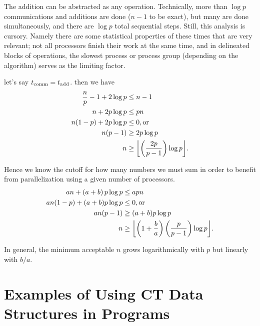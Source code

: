 The addition can be abstracted as any operation. Technically, more than
$\log{p}$ communications and additions are done ($n-1$ to be exact), but many
are done simultaneously, and there are $\log{p}$ total sequential steps. Still,
this analysis is cursory. Namely there are some statistical properties of these
times that are very relevant; not all processors finish their work at the same
time, and in delineated blocks of operations, the slowest process or process
group (depending on the algorithm) serves as the limiting factor.

let's say $t_\mathrm{comm} = t_\mathrm{add}$. then we have
\begin{align*}
\frac{n}{p} - 1 + 2\log{p}  &\leq n-1                   \\
n + 2p\log{p}               &\leq pn                    \\
n(1 - p) + 2p\log{p}        &\leq 0 \mathrm{, or}       \\
n(p - 1)                    &\geq 2p\log{p}             \\
n                           &\geq \floor*{\left(\frac{2p}{p-1}\right)\log{p}}.
\end{align*}

Hence we know the cutoff for how many numbers we must sum in order to benefit
from parallelization using a given number of processors. 
\begin{align*}
an + \left(a+b\right)p\log{p}   &\leq apn              \\
an(1 - p) + (a+b)p\log{p}       &\leq 0 \mathrm{, or}  \\
an(p - 1)                       &\geq (a+b)p\log{p}    \\
n &\geq \floor*{\left(1 + \frac{b}{a}\right)\left(\frac{p}{p-1}\right)\log{p}}.
\end{align*}

In general, the minimum acceptable $n$ grows logarithmically with $p$ but linearly
with $b/a$.

\section{Examples of Using CT Data Structures in Programs}

